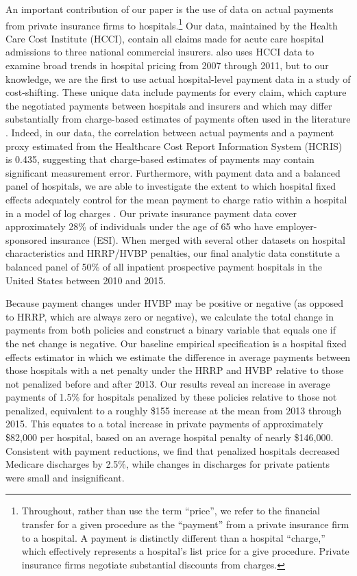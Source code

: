 \documentclass[12pt]{article}
\begin{document}
An important contribution of our paper is the use of data on actual payments from private insurance firms to hospitals.\footnote{Throughout, rather than use the term ``price'', we refer to the financial transfer for a given procedure as the ``payment'' from a private insurance firm to a hospital.  A payment is distinctly different than a hospital ``charge,'' which effectively represents a hospital's list price for a give procedure. Private insurance firms negotiate substantial discounts from charges.}  Our data, maintained by the Health Care Cost Institute (HCCI), contain all claims made for acute care hospital admissions to three national commercial insurers. \cite{cooper2015} also uses HCCI data to examine broad trends in hospital pricing from 2007 through 2011, but to our knowledge, we are the first to use actual hospital-level payment data in a study of cost-shifting. These unique data include payments for every claim, which capture the negotiated payments between hospitals and insurers and which may differ substantially from charge-based estimates of payments often used in the literature \citep{dafny2009,dranove2017}. Indeed, in our data, the correlation between actual payments and a payment proxy estimated from the Healthcare Cost Report Information System (HCRIS) is 0.435, suggesting that charge-based estimates of payments may contain significant measurement error.  Furthermore, with payment data and a balanced panel of hospitals, we are able to investigate the extent to which hospital fixed effects adequately control for the mean payment to charge ratio within a hospital in a model of log charges \citep{cutler2000}. Our private insurance payment data cover approximately 28\% of individuals under the age of 65 who have employer-sponsored insurance (ESI). When merged with several other datasets on hospital characteristics and HRRP/HVBP penalties, our final analytic data constitute a balanced panel of 50\% of all inpatient prospective payment hospitals in the United States between 2010 and 2015.

Because payment changes under HVBP may be positive or negative (as opposed to HRRP, which are always zero or negative), we calculate the total change in payments from both policies and construct a binary variable that equals one if the net change is negative.  Our baseline empirical specification is a hospital fixed effects estimator in which we estimate the difference in average payments between those hospitals with a net penalty under the HRRP and HVBP relative to those not penalized before and after 2013. Our results reveal an increase in average payments of 1.5\% for hospitals penalized by these policies relative to those not penalized, equivalent to a roughly \$155 increase at the mean from 2013 through 2015. This equates to a total increase in private payments of approximately \$82,000 per hospital, based on an average hospital penalty of nearly \$146,000. Consistent with payment reductions, we find that penalized hospitals decreased Medicare discharges by 2.5\%, while changes in discharges for private patients were small and insignificant.
\end{document}
